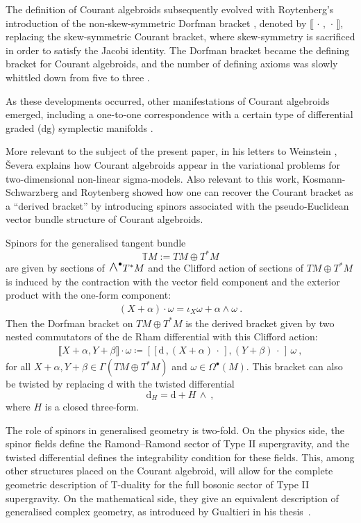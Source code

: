 \documentclass[a4paper, reqno, 11pt]{amsart}
\numberwithin{equation}{section}
\theoremstyle{definition}
\newcommand{\sfgamma}{\mathsf{\Gamma}}
\newcommand{\cbrak}[1]{\llbracket #1 \rrbracket}
\newcommand{\de}{\mathrm{d}}
\newcommand{\IT}{\mathbb{T}}
\newcommand{\sfOmega}{{\mathsf{\Omega}}}
\newcommand{\midwedge}{\text {\Large$\wedge$}}
\theoremstyle{remark}
\begin{document}
The definition of Courant algebroids subsequently evolved with Roytenberg's introduction of the non-skew-symmetric Dorfman bracket \cite{roytenberg1999courant}, denoted by $\cbrak{ \, \cdot \, , \, \cdot \,}$, replacing the skew-symmetric Courant bracket, where skew-symmetry is sacrificed in order to satisfy the Jacobi identity. The Dorfman bracket became the defining bracket for Courant algebroids, and the number of defining axioms was slowly whittled down from five to three \cite{uchino2002remarks,kosmann2005quasi}.

As these developments occurred, other manifestations of Courant algebroids emerged, including a one-to-one correspondence with a certain type of differential graded (dg) symplectic manifolds \cite{roytenberg2002structure}. 

More relevant to the subject of the present paper, in his letters to Weinstein \cite{Severa-letters}, \v Severa explains how Courant algebroids appear in the variational problems for two-dimensional non-linear sigma-models. Also relevant to this work, Kosmann-Schwarzberg and Roytenberg \cite{Kosmann-Schwarzbach:2003skv, roytenberg2002structure} showed how one can recover the Courant bracket as a ``derived bracket'' by introducing spinors associated with the pseudo-Euclidean vector bundle structure of Courant algebroids. 

Spinors for the generalised tangent bundle $$\IT M := TM \oplus T^*M$$ are given by sections of $\midwedge^\bullet T^*M$ and the Clifford action of sections of $TM \oplus T^*M$ is induced by the contraction with the vector field component and the exterior product with the one-form component:
\begin{align}\label{eqn:Cl-action}
    (X + \alpha) \cdot \omega = \iota_X \omega + \alpha \wedge \omega \ .
\end{align}
Then the Dorfman bracket on $TM \oplus T^*M$ is the derived bracket given by two nested commutators of the de Rham differential with this Clifford action:
\begin{align}
    \cbrak{X + \alpha, Y +\beta} \cdot \omega \coloneqq [[\de \, , (X+\alpha) \,\cdot\,], (Y + \beta) \,\cdot\,] \, \omega \ ,
\end{align}
for all $X+ \alpha, Y + \beta \in \sfgamma(TM \oplus T^*M)$ and $\omega \in \sfOmega^\bullet(M)$. 
This bracket can also be twisted by replacing $\de$ with the twisted differential $$\de_H = \de + H \, \wedge \ , $$ where $H$ is a closed three-form.

The role of spinors in generalised geometry is two-fold. On the physics side, the spinor fields define the Ramond--Ramond sector of Type II supergravity, and the twisted differential defines the integrability condition for these fields. This, among other structures placed on the Courant algebroid, will allow for the complete geometric description of T-duality for the full bosonic sector of Type II supergravity.
On the mathematical side, they give an equivalent description of generalised complex geometry, as introduced by Gualtieri in his thesis~\cite{gualtieri:tesi}. 
\end{document}
